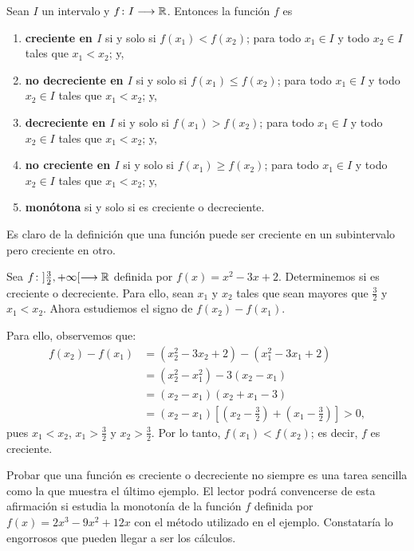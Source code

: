 \begin{defical}
Sean $I$ un intervalo y $f\colon I\longrightarrow \mathbb{R}$. Entonces la función $f$ es
\begin{enumerate}
\item \textbf{creciente en $I$} si y solo si
    $
      f(x_1) < f(x_2)
    $; para todo $x_1 \in I$ y todo $x_2 \in I$ tales que $x_1 < x_2$; y, 
      
\item \textbf{no decreciente en $I$} si y solo si
    $
      f(x_1) \leq f(x_2)
    $; para todo $x_1 \in I$ y todo $x_2 \in I$ tales que $x_1 < x_2$; y,

\item \textbf{decreciente en $I$} si y solo si
    $
      f(x_1) > f(x_2)
    $; para todo $x_1 \in I$ y todo $x_2 \in I$ tales que $x_1 < x_2$; y,

\item \textbf{no creciente en $I$} si y solo si
    $
      f(x_1) \geq f(x_2)
    $; para todo $x_1 \in I$ y todo $x_2 \in I$ tales que $x_1 < x_2$; y,

\item \textbf{monótona} si y solo si es creciente o decreciente.
\end{enumerate}
\end{defical}

Es claro de la definición que una función puede ser creciente en un subintervalo pero creciente en
otro.

\begin{exemplo}[]{}
Sea $f\colon ]\frac{3}{2},+\infty [\longrightarrow \mathbb{R}$ definida por $f(x) = x^2 - 3x + 2$. Determinemos si es
creciente o decreciente. Para ello, sean $x_1$ y $x_2$ tales que sean mayores que $\frac{3}{2}$ y
$x_1 < x_2$. Ahora estudiemos el signo de $f(x_2) - f(x_1)$.

Para ello, observemos que:
\begin{align*}
f(x_2) - f(x_1) &= (x_2^2 - 3x_2 + 2) - (x_1^2 - 3x_1 + 2) \\
  &= (x_2^2 - x_1^2) - 3(x_2 - x_1) \\
  &= (x_2 - x_1)(x_2 + x_1 - 3) \\
  &= (x_2 - x_1)[(x_2 - \frac{3}{2}) + (x_1 - \frac{3}{2})] > 0,
\end{align*}
pues $x_1 < x_2$, $x_1 > \frac{3}{2}$ y $x_2 > \frac{3}{2}$. Por lo tanto, $f(x_1) < f(x_2)$; es
decir, $f$ es creciente.
\end{exemplo}

Probar que una función es creciente o decreciente no siempre es una tarea sencilla como la que
muestra el último ejemplo. El lector podrá convencerse de esta afirmación si estudia la monotonía
de la función $f$ definida por $f(x) = 2x^3 - 9x^2 + 12x$ con el método utilizado en el ejemplo.
Constataría lo engorrosos que pueden llegar a ser los cálculos.

